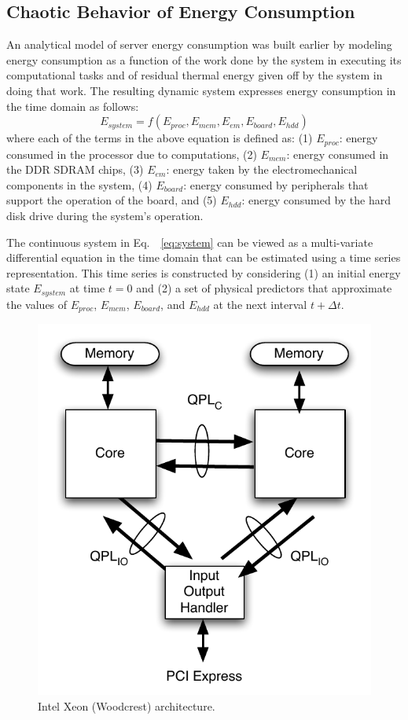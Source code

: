 \documentclass[times, 10pt,twocolumn]{IEEEtran}
\newcommand{\equationnames}{Eq.\ }
\begin{document}
\subsection{Chaotic Behavior of Energy Consumption}
\label{sec:chaot-pred-energy}
An analytical model of server energy consumption was built earlier
\cite{Lewis2008,Lewis2010} by modeling energy consumption as a
function of the work done by the system in executing its computational
tasks and of residual thermal energy given off by the system in doing
that work.  The resulting dynamic system expresses energy consumption in
the time domain as follows:
\begin{equation}
  \label{eq:system}
  E_{system}=f(E_{proc},E_{mem},E_{em},E_{board},E_{hdd})
\end{equation}
where each of the terms in the above equation is defined as: (1)
$E_{proc}$: energy consumed in the processor due to computations, (2)
$E_{mem}$: energy consumed in the DDR SDRAM chips, (3) $E_{em}$: energy
taken by the electromechanical components in the system, (4)
$E_{board}$: energy consumed by peripherals that support the operation
of the board, and (5) $E_{hdd}$: energy consumed by the hard disk drive
during the system's operation.

The continuous system in \equationnames~\eqref{eq:system} can be viewed
as a multi-variate differential equation in the time domain that can be
estimated using a time series representation. This time series is
constructed by considering (1) an initial energy state $E_{system}$ at
time $t=0$ and (2) a set of physical predictors that approximate the
values of $E_{proc}$, $E_{mem}$, $E_{board}$, and $E_{hdd}$ at the next
interval $t+\Delta t$.

\begin{figure}[tbph]
  \centering
  \includegraphics[scale=0.5]{intelnehalem}
  \caption{Intel Xeon (Woodcrest) architecture.}
  \label{fig:intarch}
\end{figure}
\end{document}
